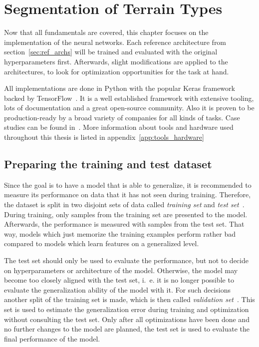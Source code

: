 \section{Segmentation of Terrain Types}
\label{sec:segmentation}

Now that all fundamentals are covered, this chapter focuses on the implementation of the neural networks. Each reference architecture from section~\ref{sec:ref_archs} will be trained and evaluated with the original hyperparameters first. Afterwards, slight modifications are applied to the architectures, to look for optimization opportunities for the task at hand.

All implementations are done in Python with the popular Keras framework backed by TensorFlow~\cite{tf_whitepaper15}. It is a well established framework with extensive tooling, lots of documentation and a great open-source community. Also it is proven to be production-ready by a broad variety of companies for all kinds of tasks. Case studies can be found in~\cite{tf_casestudy20}. More information about tools and hardware used throughout this thesis is listed in appendix~\ref{app:tools_hardware}

\subsection{Preparing the training and test dataset}
\label{sec:prepare_train_test}

Since the goal is to have a model that is able to generalize, it is recommended to measure its performance on data that it has not seen during training. Therefore, the dataset is split in two disjoint sets of data called \emph{training set} and \emph{test set}~\cite[p.~101f]{DLbook16}. During training, only samples from the training set are presented to the model. Afterwards, the performance is measured with samples from the test set. That way, models which just memorize the training examples perform rather bad compared to models which learn features on a generalized level.

The test set should only be used to evaluate the performance, but not to decide on hyperparameters or architecture of the model. Otherwise, the model may become too closely aligned with the test set, i.~e. it is no longer possible to evaluate the generalization ability of the model with it. For such decisions another split of the training set is made, which is then called \emph{validation set}~\cite[p.~119]{DLbook16}. This set is used to estimate the generalization error during training and optimization without consulting the test set. Only after all optimizations have been done and no further changes to the model are planned, the test set is used to evaluate the final performance of the model.


